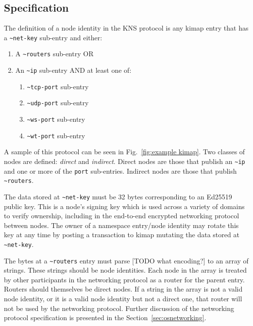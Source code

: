 \documentclass[runningheads]{llncs}
\begin{document}
\subsection{Specification}
\label{sec:knsspec}

The definition of a node identity in the KNS protocol is any kimap entry that has a \verb|~net-key| sub-entry and either:
\begin{enumerate}
\item A \verb|~routers| sub-entry OR
\item An \verb|~ip| sub-entry AND at least one of:
	\begin{enumerate}
	\item \verb|~tcp-port| sub-entry
	\item \verb|~udp-port| sub-entry
	\item \verb|~ws-port| sub-entry
	\item \verb|~wt-port| sub-entry
	\end{enumerate}
\end{enumerate}

A sample of this protocol can be seen in Fig.~\ref{fig:example kimap}.
Two classes of nodes are defined: \textit{direct} and \textit{indirect}.
Direct nodes are those that publish an \verb|~ip| and one or more of the \verb|port| sub-entries.
Indirect nodes are those that publish \verb|~routers|. %

The data stored at \verb|~net-key| must be 32 bytes corresponding to an Ed25519 public key.
This is a node's signing key which is used across a variety of domains to verify ownership, including in the end-to-end encrypted networking protocol between nodes.
The owner of a namespace entry/node identity may rotate this key at any time by posting a transaction to kimap mutating the data stored at \verb|~net-key|.

The bytes at a \verb|~routers| entry must parse [TODO what encoding?] to an array of strings.
These strings should be node identities.
Each node in the array is treated by other participants in the networking protocol as a router for the parent entry.
Routers should themselves be direct nodes.
If a string in the array is not a valid node identity, or it is a valid node identity but not a direct one, that router will not be used by the networking protocol.
Further discussion of the networking protocol specification is presented in the Section~\ref{sec:osnetworking}.
\end{document}
